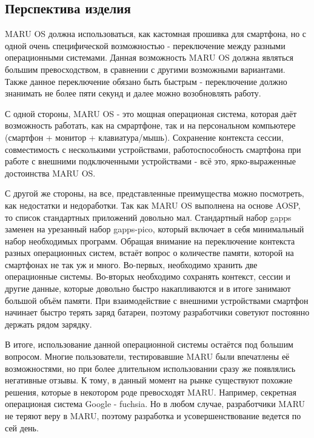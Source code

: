 \documentclass[a4paper, 14pt]{article}
\begin{document}

\subsection{Перспектива изделия}

\par MARU OS должна использоваться, как кастомная прошивка для смартфона, но с одной очень специфической возможностью - переключение между разными операционными системами. Данная возможность MARU OS должна являться большим превосходством, в сравнении с другими возможными вариантами. Также данное переключение обязано быть быстрым - переключение должно знанимать не более пяти секунд и далее можно возобновлять работу.

\par С одной стороны, MARU OS - это мощная операционая система, которая даёт возможность работать, как на смрартфоне, так и на персональном компьютере (смартфон + монитор + клавиатура/мышь). Сохранение контекста сессии, совместимость с несколькими устройствами, работоспособность смартфона при работе с внешними подключенными устройствами - всё это, ярко-выраженные достоинства MARU OS.

\par С другой же стороны, на все, представленные преимущества можно посмотреть, как недостатки и недоработки. Так как MARU OS выполнена на основе AOSP, то список стандартных приложений довольно мал. Стандартный набор gapps заменен на урезанный набор gapps-pico, который включает в себя минимальный набор необходимых программ. Обращая внимание на переключение контекста разных операционных систем, встаёт вопрос о количестве памяти, которой на смартфонах не так уж и много. Во-первых, необходимо хранить две операционные системы. Во-вторых необходимо сохранять контекст, сессии и другие данные, которые довольно быстро накапливаются и в итоге занимают большой объём памяти. При взаимодействие с внешними устройствами смартфон начинает быстро терять заряд батареи, поэтому разработчики советуют постоянно держать рядом зарядку.

\par В итоге, использование данной операционной системы остаётся под большим вопросом. Многие пользователи, тестировавшие MARU были впечатлены её возможностями, но при более длительном использовании сразу же появлялись негативные отзывы. К тому, в данный момент на рынке существуют похожие решения, которые в некотором роде превосходят MARU. Например, секретная операционая система Google - fuchsia. Но в любом случае, разработчики MARU не теряют веру в MARU, поэтому разработка и усовершенствование ведется по сей день.
\end{document}
